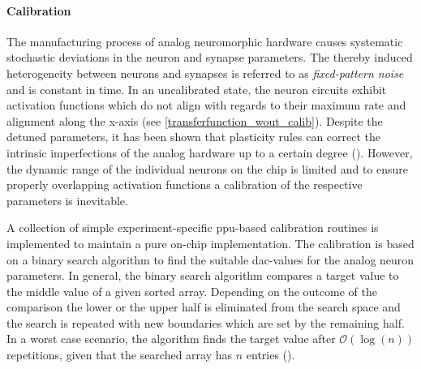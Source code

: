 
%
%
\paragraph{Calibration}\label{calibration}
The manufacturing process of analog neuromorphic hardware causes systematic stochastic deviations in the neuron and synapse parameters. The thereby induced heterogeneity between neurons and synapses is referred to as \emph{fixed-pattern noise} and is constant in time. In an uncalibrated state, the neuron circuits exhibit activation functions which do not align with regards to their maximum rate and alignment along the x-axis (see \cref{transferfunction_wout_calib}). Despite the detuned parameters, it has been shown that plasticity rules can correct the intrinsic imperfections of the analog hardware up to a certain degree (\citealp{wunderlich2019advantages}). However, the dynamic range of the individual neurons on the chip is limited and to ensure properly overlapping activation functions a calibration of the respective parameters is inevitable.

A collection of simple experiment-specific \gls{ppu}-based calibration routines is implemented to maintain a pure on-chip implementation. The calibration is based on a binary search algorithm to find the suitable \gls{dac}-values for the analog neuron parameters. In general, the binary search algorithm compares a target value to the middle value of a given sorted array. Depending on the outcome of the comparison the lower or the upper half is eliminated from the search space and the search is repeated with new boundaries which are set by the remaining half. In a worst case scenario, the algorithm finds the target value after $\mathcal{O}(\log(n))$ repetitions, given that the searched array has $n$ entries  (\citealp{binarysearchsource}).

